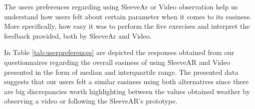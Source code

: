 \begin{table}[!t]
\centering
{}
\caption{Questionnaire results}
\label{tab:userpreferences}
\end{table}


The users preferences regarding using SleeveAr or Video observation help us understand how users felt about certain parameter when it comes to its easiness. 
More specifically, how easy it was to perform the five exercises and interpret the feedback provided, both by SleeveAr and Video. 

In Table \ref{tab:userpreferences} are depicted the responses obtained from our questionnaires regarding the overall easiness of using SleeveAR and Video presented in the form of median and interquartile range. 
The presented data suggests that our users felt a similar easiness using both alternatives since there are big discrepancies worth highlighting between the values obtained weather by observing a video or following the SleeveAR's prototype.

